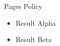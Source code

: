 \documentclass[14pt,t]{beamer}
\begin{document}
\begin{frame}{Pages Policy}
\begin{itemize}
\item<1-> Result Alpha
\item<2-> Result Beta
\end{itemize}
\end{frame}
\end{document}
